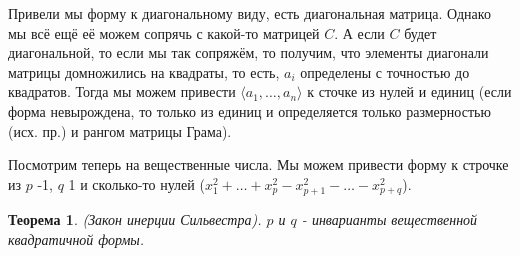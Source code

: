 \documentclass[a4paper,100pt]{article}
\theoremstyle{indented}
\newtheorem{theorem}{Теорема}
\theoremstyle{definition}
\theoremstyle{remark}
\begin{document}
Привели мы форму к диагональному виду, есть диагональная матрица. Однако мы всё ещё её можем сопрячь с какой-то матрицей $C$. А если $C$ будет диагональной, то если мы так сопряжём, то получим, что элементы диагонали матрицы домножились на квадраты, то есть, $a_i$ определены с точностью до квадратов. Тогда мы можем привести $\langle a_1, \ldots, a_n \rangle$ к сточке из нулей и единиц (если форма невырождена, то только из единиц и определяется только размерностью (исх. пр.) и рангом матрицы Грама). \ 

Посмотрим теперь на вещественные числа. Мы можем привести форму к строчке из $p$ -1, $q$ 1 и сколько-то нулей ($x_1^2+\ldots+x_p^2-x_{p+1}^2-\ldots - x_{p+q}^2$). \\

\begin{theorem}
    (Закон инерции Сильвестра). $p$ и $q$ - инварианты вещественной квадратичной формы. 
\end{theorem}
\end{document}
